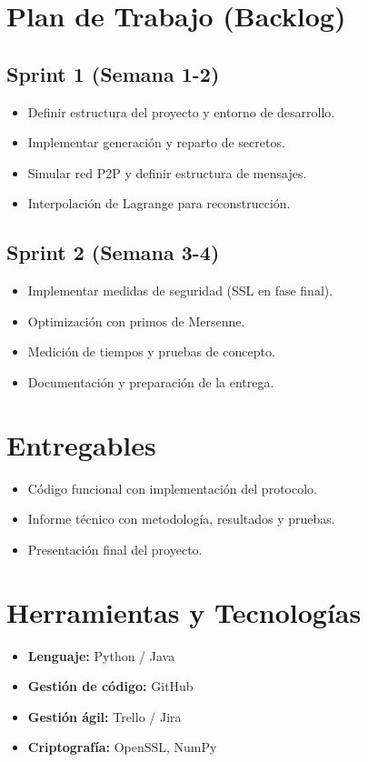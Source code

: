 \documentclass[a4paper,12pt]{article}
\begin{document}
\section*{Plan de Trabajo (Backlog)}
\subsection*{Sprint 1 (Semana 1-2)}
\begin{itemize}
    \item \checkmark Definir estructura del proyecto y entorno de desarrollo.
    \item \checkmark Implementar generación y reparto de secretos.
    \item \checkmark Simular red P2P y definir estructura de mensajes.
    \item \checkmark Interpolación de Lagrange para reconstrucción.
\end{itemize}

\subsection*{Sprint 2 (Semana 3-4)}
\begin{itemize}
    \item \checkmark Implementar medidas de seguridad (SSL en fase final).
    \item \checkmark Optimización con primos de Mersenne.
    \item \checkmark Medición de tiempos y pruebas de concepto.
    \item \checkmark Documentación y preparación de la entrega.
\end{itemize}

\section*{Entregables}
\begin{itemize}
    \item Código funcional con implementación del protocolo.
    \item Informe técnico con metodología, resultados y pruebas.
    \item Presentación final del proyecto.
\end{itemize}

\section*{Herramientas y Tecnologías}
\begin{itemize}
    \item \textbf{Lenguaje:} Python / Java
    \item \textbf{Gestión de código:} GitHub
    \item \textbf{Gestión ágil:} Trello / Jira
    \item \textbf{Criptografía:} OpenSSL, NumPy
\end{itemize}
\end{document}
